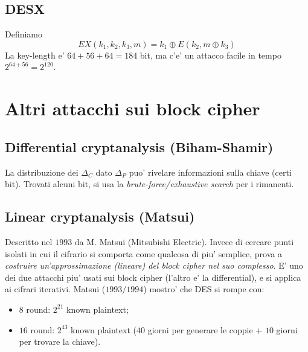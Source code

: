 \subsection{DESX}
Definiamo
\[
  EX(k_1,k_2,k_3,m) = k_1 \oplus E(k_2, m \oplus k_3)
\]
La key-length e' $ 64 + 56 + 64 = 184 $ bit, ma c'e' un attacco facile in tempo $ 2^{64+56} = 2^{120} $.

\section{Altri attacchi sui block cipher}

\subsection{Differential cryptanalysis (Biham-Shamir)}
La distribuzione dei $ \Delta_C $ dato $ \Delta_P $ puo' rivelare informazioni sulla chiave (certi bit). Trovati alcuni bit, si usa la \textit{brute-force/exhaustive search} per i rimanenti.

\subsection{Linear cryptanalysis (Matsui)}
Descritto nel $ 1993 $ da M. Matsui (Mitsubishi Electric). Invece di cercare punti isolati in cui il cifrario si comporta come qualcosa di piu' semplice, prova a \textit{costruire un'approssimazione (lineare) del block cipher nel suo complesso}. E' uno dei due attacchi piu' usati sui block cipher (l'altro e' la differential), e si applica ai cifrari iterativi. Matsui ($ 1993/1994 $) mostro' che DES si rompe con:
\begin{itemize}
  \item $ 8 $ round: $ 2^{21} $ known plaintext;
  \item $ 16 $ round: $ 2^{43} $ known plaintext ($ 40 $ giorni per generare le coppie + $ 10 $ giorni per trovare la chiave).
\end{itemize}

